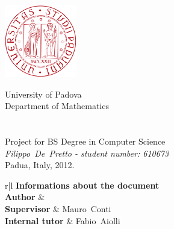 \documentclass[a4paper,11pt]{article}
\def\ME				{\mbox{Filippo De Pretto}}
\def\SERIAL			{\mbox{610673}}
\def\SUPERVISOR		{\mbox{Mauro Conti}}
\def\TUTOR			{\mbox{Fabio Aiolli}}
\def\END			{Padua, Italy, 2012.}
\begin{document}
		
\thispagestyle{empty}

\begin{center}

\includegraphics[height=120px]{../documentation/img/unipd_logo.png}

\vspace{0.5cm}
{\Huge University of Padova}\\[.5pc]
{\Large Department of Mathematics}\\[.5pc]
\vspace{5 mm}
{\Huge \textbf{\PROJECT{}}}\\[.5pc]
{\Huge \SUBTITLE}\\[.4pc]
{\Large Project for BS Degree in Computer Science}\\[.5pc]
{\Large \emph{\ME{} - student number: \SERIAL{}}}\\[1pc]


\vspace{0.5cm}
{\Large \END}\\[3pc]

\normalsize{
	\begin{tabular}{r|l}
		 {\textbf{Informations about the document}} \\
		\midrule
		\textbf{Author} 				& \AUTHOR \\
		\textbf{Supervisor} 			& \SUPERVISOR \\
		\textbf{Internal tutor} 		& \TUTOR \\
	\end{tabular}
}

\end{center}

\newpage
\end{document}
